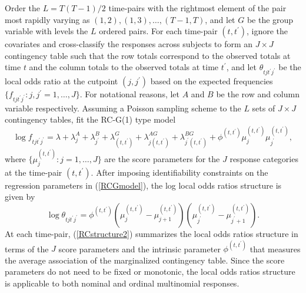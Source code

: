 \documentclass[
]{jss}
\begin{document}
Order the \(L=T(T-1)/2\) time-pairs with the rightmost element of the
pair most rapidly varying as \((1,2),(1,3),\ldots,(T-1,T)\), and let
\(G\) be the group variable with levels the \(L\) ordered pairs. For
each time-pair \((t,t^{\prime})\), ignore the covariates and
cross-classify the responses across subjects to form an \(J \times J\)
contingency table such that the row totals correspond to the observed
totals at time \(t\) and the column totals to the observed totals at
time \(t^{\prime}\), and let \(\theta_{tjt^{\prime}j^{\prime}}\) be the
local odds ratio at the cutpoint \((j,j^{\prime})\) based on the
expected frequencies
\(\{f_{tjt^{\prime}j^{\prime}}:j,j^{\prime}=1,\ldots,J\}\). For
notational reasons, let \(A\) and \(B\) be the row and column variable
respectively. Assuming a Poisson sampling scheme to the \(L\) sets of
\(J \times J\) contingency tables, fit the RC-G(1) type model
\citep{Becker1989a} \begin{equation}
\log f_{tjt^{\prime}j^{\prime}}=\lambda+\lambda^{A}_{j}+\lambda^{B}_{j^{\prime}}+\lambda^{G}_{(t,t^{\prime})}+\lambda^{AG}_{j(t,t^{\prime})}+\lambda^{BG}_{j^{\prime}(t,t^{\prime})}+\phi^{(t,t^{\prime})}\mu^{(t,t^{\prime})}_j \mu^{(t,t^{\prime})}_{j^{\prime}}, 
\label{RCGmodel}
\end{equation} where \(\{\mu^{(t,t^{\prime})}_{j}:j=1,\ldots,J\}\) are
the score parameters for the \(J\) response categories at the time-pair
\((t,t^{\prime})\). After imposing identifiability constraints on the
regression parameters in (\ref{RCGmodel}), the log local odds ratios
structure is given by \begin{equation}
\log \theta_{tjt^{\prime}j^{\prime}}=\phi^{(t,t^{\prime})}\left(\mu^{(t,t^{\prime})}_{j}-\mu^{(t,t^{\prime})}_{j+1}\right)\left(\mu^{(t,t^{\prime})}_{j^{\prime}}-\mu^{(t,t^{\prime})}_{j^{\prime}+1}\right).
\label{RCstructure2}
\end{equation} At each time-pair, (\ref{RCstructure2}) summarizes the
local odds ratios structure in terms of the \(J\) score parameters and
the intrinsic parameter \(\phi^{(t,t^{\prime})}\) that measures the
average association of the marginalized contingency table. Since the
score parameters do not need to be fixed or monotonic, the local odds
ratios structure is applicable to both nominal and ordinal multinomial
responses.
\end{document}
